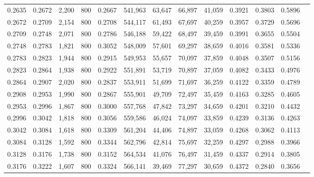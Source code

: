 \begin{tabular}{rrrrrrrrrrrrr}
0.2635 & 0.2672 &  2,200 &   800 &                                     0.2667 & 541,963 &  63,647 &  66,897 &  41,059 & 0.3921 & 0.3803 & 0.5896 \\
0.2672 & 0.2709 &  2,154 &   800 &                                     0.2708 & 544,117 &  61,493 &  67,697 &  40,259 & 0.3957 & 0.3729 & 0.5696 \\
0.2709 & 0.2748 &  2,071 &   800 &                                     0.2786 & 546,188 &  59,422 &  68,497 &  39,459 & 0.3991 & 0.3655 & 0.5504 \\
0.2748 & 0.2783 &  1,821 &   800 &                                     0.3052 & 548,009 &  57,601 &  69,297 &  38,659 & 0.4016 & 0.3581 & 0.5336 \\
0.2783 & 0.2823 &  1,944 &   800 &                                     0.2915 & 549,953 &  55,657 &  70,097 &  37,859 & 0.4048 & 0.3507 & 0.5156 \\
0.2823 & 0.2864 &  1,938 &   800 &                                     0.2922 & 551,891 &  53,719 &  70,897 &  37,059 & 0.4082 & 0.3433 & 0.4976 \\
0.2864 & 0.2907 &  2,020 &   800 &                                     0.2837 & 553,911 &  51,699 &  71,697 &  36,259 & 0.4122 & 0.3359 & 0.4789 \\
0.2908 & 0.2953 &  1,990 &   800 &                                     0.2867 & 555,901 &  49,709 &  72,497 &  35,459 & 0.4163 & 0.3285 & 0.4605 \\
0.2953 & 0.2996 &  1,867 &   800 &                                     0.3000 & 557,768 &  47,842 &  73,297 &  34,659 & 0.4201 & 0.3210 & 0.4432 \\
0.2996 & 0.3042 &  1,818 &   800 &                                     0.3056 & 559,586 &  46,024 &  74,097 &  33,859 & 0.4239 & 0.3136 & 0.4263 \\
0.3042 & 0.3084 &  1,618 &   800 &                                     0.3309 & 561,204 &  44,406 &  74,897 &  33,059 & 0.4268 & 0.3062 & 0.4113 \\
0.3084 & 0.3128 &  1,592 &   800 &                                     0.3344 & 562,796 &  42,814 &  75,697 &  32,259 & 0.4297 & 0.2988 & 0.3966 \\
0.3128 & 0.3176 &  1,738 &   800 &                                     0.3152 & 564,534 &  41,076 &  76,497 &  31,459 & 0.4337 & 0.2914 & 0.3805 \\
0.3176 & 0.3222 &  1,607 &   800 &                                     0.3324 & 566,141 &  39,469 &  77,297 &  30,659 & 0.4372 & 0.2840 & 0.3656 \\

\end{tabular}
